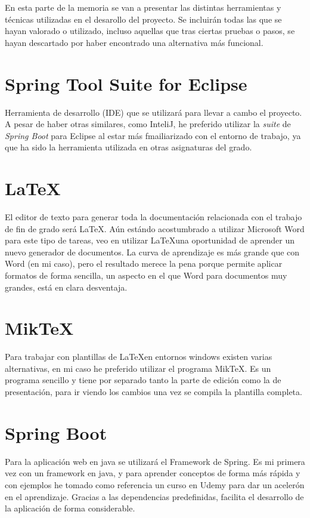 

En esta parte de la memoria se van a presentar las distintas herramientas y técnicas utilizadas en el desarollo del proyecto.
Se incluirán todas las que se hayan valorado o utilizado, incluso aquellas que tras ciertas pruebas o pasos, se hayan descartado por haber encontrado una alternativa más funcional.

\section{Spring Tool Suite for Eclipse}

Herramienta de desarrollo (IDE) que se utilizará para llevar a cambo el proyecto.
A pesar de haber otras similares, como InteliJ, he preferido utilizar la \textit{suite} de \textit{Spring Boot} para Eclipse al estar más fmailiarizado con el entorno de trabajo, ya que ha sido la herramienta utilizada en otras asignaturas del grado.

\section{\LaTeX}
El editor de texto para generar toda la documentación relacionada con el trabajo de fin de grado será \LaTeX.
Aún estándo acostumbrado a utilizar Microsoft Word para este tipo de tareas, veo en utilizar \LaTeX  una oportunidad de aprender un nuevo generador de documentos.
La curva de aprendizaje es más grande que con Word (en mi caso), pero el resultado merece la pena porque permite aplicar formatos de forma sencilla, un aspecto en el que Word para documentos muy grandes, está en clara desventaja.

\section{Mik\TeX{}}
Para trabajar con plantillas de \LaTeX  en entornos windows existen varias alternativas, en mi caso he preferido utilizar el programa Mik\TeX{}.
Es un programa sencillo y tiene por separado tanto la parte de edición como la de presentación, para ir viendo los cambios una vez se compila la plantilla completa.

\section{Spring Boot}

Para la aplicación web en java se utilizará el Framework de Spring.
Es mi primera vez con un framework en java, y para aprender conceptos de forma más rápida y con ejemplos he tomado como referencia un curso en Udemy \cite{udemy:eliseo} para dar un acelerón en el aprendizaje.
Gracias a las dependencias predefinidas, facilita el desarrollo de la aplicación de forma considerable.

